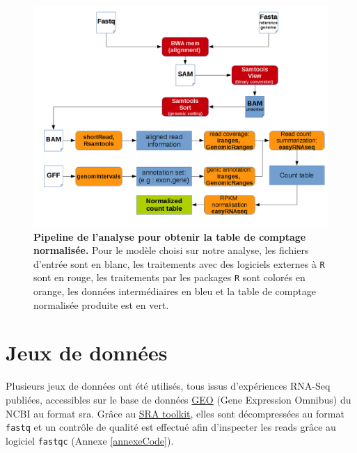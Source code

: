 \documentclass[12pt,a4paper]{report}
\begin{document}
\begin{onehalfspace}
\begin{figure}[h!]
\centerline{\includegraphics[scale=0.9]{figures/data_preparation.png}}
\caption{\textbf{Pipeline de l'analyse pour obtenir la table de comptage normalisée.} Pour le modèle choisi sur notre analyse, les fichiers d'entrée sont en blanc, les traitements avec des logiciels externes à \texttt{R} sont en rouge, les traitements par les packages \texttt{R} sont colorés en orange, les données intermédiaires en bleu et la table de comptage normalisée produite est en vert.}
\label{fig:data_preparation} 
\end{figure}

\section*{Jeux de données}
Plusieurs jeux de données ont été utilisés, tous issus d'expériences RNA-Seq publiées, accessibles sur le base de données \href{http://www.ncbi.nlm.nih.gov/geo/}{GEO} (Gene Expression Omnibus) du NCBI au format \gls{sra}. Grâce au \href{http://www.ncbi.nlm.nih.gov/books/NBK158900/#SRA_download.how_do_i_use_the_sra_toolki}{SRA toolkit}, elles sont décompressées au format \texttt{fastq} et un contrôle de qualité est effectué afin d'inspecter les reads grâce au logiciel \texttt{fastqc} (Annexe \ref{annexeCode}).


\end{onehalfspace}
\end{document}
